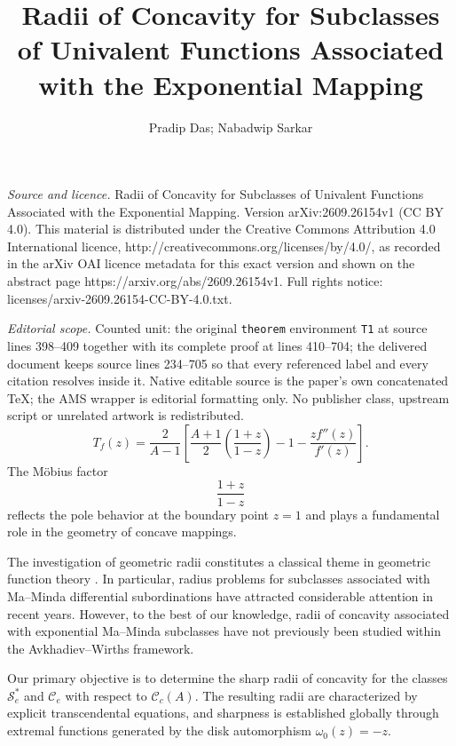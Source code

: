 \documentclass[10pt,a4paper]{amsart}
\begin{document}
\title[Radii of Concavity for Subclasses of Univalent Functions Ass]{Radii of Concavity for Subclasses of Univalent Functions Associated with the Exponential Mapping}
\author{Pradip Das; Nabadwip Sarkar}
\date{}
\maketitle
\noindent\emph{Source and licence.} Radii of Concavity for Subclasses of Univalent Functions Associated with the Exponential Mapping. Version arXiv:2609.26154v1 (CC BY 4.0). This material is distributed under the Creative Commons Attribution 4.0 International licence, http://creativecommons.org/licenses/by/4.0/, as recorded in the arXiv OAI licence metadata for this exact version and shown on the abstract page https://arxiv.org/abs/2609.26154v1. Full rights notice: licenses/arxiv-2609.26154-CC-BY-4.0.txt.\par\smallskip
\noindent\textit{Editorial scope.} Counted unit: the original \texttt{theorem} environment \texttt{T1} at source lines 398--409 together with its complete proof at lines 410--704; the delivered document keeps source lines 234--705 so that every referenced label and every citation resolves inside it. Native editable source is the paper's own concatenated TeX; the AMS wrapper is editorial formatting only. No publisher class, upstream script or unrelated artwork is redistributed.
\begin{equation}\label{pm1}
T_f(z)
=
\frac{2}{A-1}
\left[
\frac{A+1}{2}
\left(
\frac{1+z}{1-z}
\right)
-
1
-
\frac{zf''(z)}{f'(z)}
\right].
\end{equation}
The M\"obius factor
\[
\frac{1+z}{1-z}
\]
reflects the pole behavior at the boundary point $z=1$ and plays a fundamental role in the geometry of concave mappings.

The investigation of geometric radii constitutes a classical theme in geometric function theory \cite{pm8, pm9, pm12}. In particular, radius problems for subclasses associated with Ma--Minda differential subordinations have attracted considerable attention in recent years. However, to the best of our knowledge, radii of concavity associated with exponential Ma--Minda subclasses have not previously been studied within the Avkhadiev--Wirths framework.

Our primary objective is to determine the sharp radii of concavity for the classes $\mathcal{S}_e^*$ and $\mathcal{C}_e$ with respect to $\mathcal{C}_c(A)$. The resulting radii are characterized by explicit transcendental equations, and sharpness is established globally through extremal functions generated by the disk automorphism $\omega_0(z)=-z$.
\end{document}
